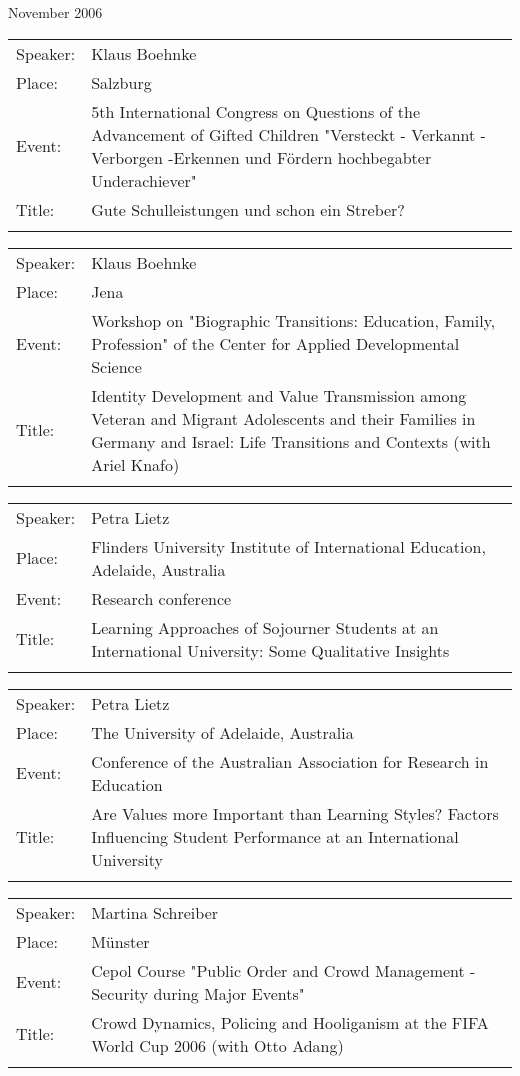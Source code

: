 {\begin{flushleft}
November 2006\\[0.5cm]
\end{flushleft}
\begin{tabular}{lp{13.4cm}}
 Speaker:	& Klaus Boehnke \\
 Place: 	 &Salzburg\\
 Event:   &	5th International Congress on Questions of the Advancement of Gifted Children "Versteckt - Verkannt - Verborgen -Erkennen und F\"{o}rdern hochbegabter Underachiever"\\
 Title: &	Gute Schulleistungen und schon ein Streber?\\ \\
\end{tabular}
\begin{tabular}{lp{13.4cm}}
 Speaker:	& Klaus Boehnke \\
 Place: 	 &Jena\\
 Event:   &	Workshop on "Biographic Transitions: Education, Family, Profession" of the Center for Applied Developmental Science\\
 Title: &	Identity Development and Value Transmission among Veteran and Migrant Adolescents and their Families in Germany and Israel: Life Transitions and Contexts (with Ariel Knafo)\\ \\
\end{tabular}
\begin{tabular}{lp{13.4cm}}
 Speaker:	& Petra Lietz \\
 Place: 	 &Flinders University Institute of International Education, Adelaide, Australia\\
 Event:   &	Research conference\\
 Title: &	Learning Approaches of Sojourner Students at an International University: Some Qualitative Insights\\ \\
\end{tabular}
\begin{tabular}{lp{13.4cm}}
 Speaker:	& Petra Lietz \\
 Place: 	 &The University of Adelaide, Australia\\
 Event:   &	Conference of the Australian Association for Research in Education\\
 Title: &	Are Values more Important than Learning Styles? Factors Influencing Student Performance at an International University\\ \\
\end{tabular}
\begin{tabular}{lp{13.4cm}}
 Speaker:	& Martina Schreiber\\
 Place: 	 &M\"{u}nster\\
 Event:   &	Cepol Course "Public Order and Crowd Management - Security during Major Events"\\
 Title: &	Crowd Dynamics, Policing and Hooliganism at the FIFA World Cup 2006 (with Otto Adang)\\ \\
\end{tabular}
	



}
